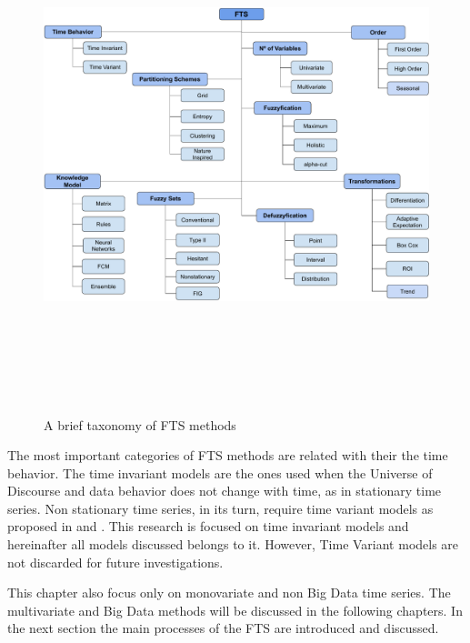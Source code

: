 \begin{figure}[htb]
    \centering
    \includegraphics[width=\textwidth, height=15cm]{figures/fts_taxonomy.pdf}
    \caption{A brief taxonomy of FTS methods}
    \label{fig:fts_taxonomy}
\end{figure}

The most important categories of FTS methods are related with their the time behavior. The time invariant models are the ones used when the Universe of Discourse and data behavior  does not change with time, as in stationary time series. Non stationary time series, in its turn, require time variant models as proposed in \cite{Song1994} and \cite{Wong2010}. This research is focused on time invariant models and hereinafter all models discussed belongs to it. However, Time Variant models are not discarded for future investigations.

This chapter also focus only on monovariate and non Big Data time series. The multivariate and Big Data methods will be discussed in the following chapters. In the next section the main processes of the FTS are introduced and discussed.


